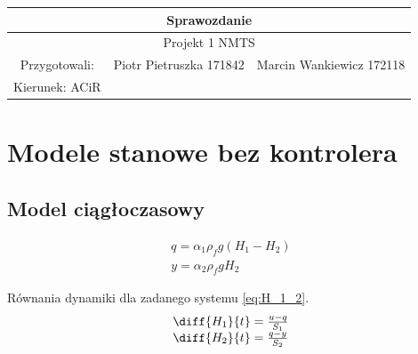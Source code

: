 \documentclass{article}
\begin{document}
\begin{tabular}{|c|c|c|}
\hline 
\multicolumn{3}{|c|}{\huge Sprawozdanie } \\ 
\hline 
\multicolumn{3}{|c|}{\LARGE Projekt 1  NMTS} \\ 
\hline 
\Large Przygotowali: &\Large Piotr Pietruszka 171842 &\Large Marcin Wankiewicz 172118  \\ 
\hline 
\Large Kierunek: ACiR  \\ 
\hline 
 
\end{tabular} 

\section{Modele stanowe bez kontrolera}

\subsection{Model ciągłoczasowy}

\begin{equation}\label{eq:q_y}
 \begin{array}{l}
  q = \alpha_1 \rho_f g (H_1 - H_2) \\
  y = \alpha_2 \rho_f g H_2
\end{array}
\end{equation}

Równania dynamiki dla zadanego systemu  \ref{eq:H_1_2}.
\begin{equation}\label{eq:H_1_2}
 \begin{array}{l}
  \diff{H_1}{t} = \frac{u-q}{S_1} \\
  \diff{H_2}{t} = \frac{q-y}{S_2}
 \end{array}
\end{equation}
\end{document}
